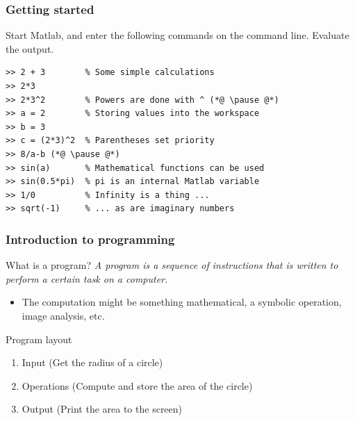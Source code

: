 \documentclass[11pt,table,final,fleqn,xcolor={usenames,dvipsnames},unknownkeysallowed,handout]{beamer}
\begin{document}
\begin{frame}[fragile]
 \frametitle{Getting started}
  Start Matlab, and enter the following commands on the command line. Evaluate the output.
  \pause
  \begin{lstlisting}
>> 2 + 3        % Some simple calculations
>> 2*3
>> 2*3^2        % Powers are done with ^ (*@ \pause @*)
>> a = 2        % Storing values into the workspace
>> b = 3
>> c = (2*3)^2  % Parentheses set priority
>> 8/a-b (*@ \pause @*)
>> sin(a)       % Mathematical functions can be used 
>> sin(0.5*pi)  % pi is an internal Matlab variable
>> 1/0          % Infinity is a thing ...
>> sqrt(-1)     % ... as are imaginary numbers
  \end{lstlisting}
\end{frame}

\begin{frame}
 \frametitle{Introduction to programming}
 \begin{block}{What is a program?}
  \emph{A program is a sequence of instructions that is written to perform a certain task on a computer.} %
  \end{block}
  \begin{itemize}
    \item The computation might be something mathematical, a symbolic operation, image analysis, etc.%
  \end{itemize}
  \begin{block}{Program layout}
    \begin{enumerate}
        \item Input (Get the radius of a circle)
        \item Operations (Compute and store the area of the circle)
        \item Output (Print the area to the screen)
    \end{enumerate}
  \end{block}
\end{frame}
\end{document}
